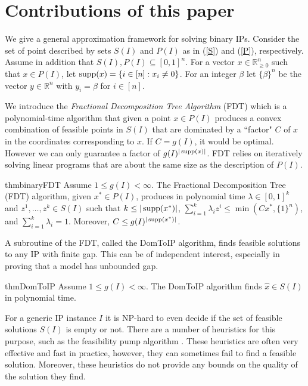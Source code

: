 \section{Contributions of this paper} 
 
We give a general approximation framework for solving binary IPs.  Consider the set of point described by sets $S(I)$ and $P(I)$ as in (\ref{S}) and (\ref{P}), respectively. Assume in addition that $S(I),P(I)\subseteq [0,1]^n$. For a vector $x\in \mathbb{R}_{\geq 0}^n$ such that $x\in P(I)$, let $\operatorname{supp}(x)= \{i \in [n]: x_i \neq 0\}$. For an integer $\beta$ let $\{\beta\}^n$ be the vector $y\in \mathbb{R}^n$ with $y_i=\beta$ for $i\in [n]$.


We introduce the \textit{Fractional Decomposition Tree Algorithm} (FDT) which is a polynomial-time algorithm that given a point $x\in P(I)$ produces a convex combination of feasible points in $S(I)$ that are dominated by a ``factor" $C$ of $x$ in the coordinates corresponding to $x$. If $C = g(I)$, it would be optimal. However we can only guarantee a factor of $g(I)^{|\operatorname{supp}(x)|}$. FDT relies on iteratively solving linear programs that are about the same size as the description of $P(I)$.

\begin{restatable}{thm}{binaryFDT}
	\label{binaryFDT}
	Assume $1\leq g(I) 	<\infty$. 	
	The Fractional Decomposition Tree (FDT) algorithm, given $x^*\in P(I)$, produces in polynomial time $\lambda\in [0,1]^k$ and $z^1,\ldots,z^k \in S(I)$ such that $k\leq |\operatorname{supp}(x^*)|$, $\sum_{i=1}^{k}\lambda_i z^i\leq \min(Cx^*,\{1\}^{n})$, and $\sum_{i=1}^{k}\lambda_i = 1$. Moreover, $C\leq g(I)^{|\operatorname{supp}(x^*)|}$.
\end{restatable}

A subroutine of the FDT, called the DomToIP algorithm, finds feasible solutions to any IP with finite gap. This can be of independent interest, especially in proving that a model has unbounded gap.
\begin{restatable}{thm}{DomToIP}
	\label{domtoIP}
	Assume $1\leq g(I) < \infty$. The DomToIP algorithm finds $\hat{x}\in S(I)$ in polynomial time.
\end{restatable}

For a generic IP instance $I$ it is NP-hard to even decide if the set of feasible solutions $S(I)$ is empty or not. There are a number of heuristics for this purpose, such as the feasibility pump algorithm \cite{fp1,fp2}. These heuristics are often very effective and fast in practice, however, they can sometimes fail to find a feasible solution. Moreover, these heuristics do not provide any bounds on the quality of the solution they find. 

